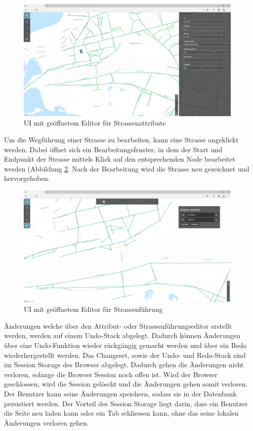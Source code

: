 \begin{figure}[H]
\centering
\includegraphics[height=6cm]{images/EditStreetattributes.PNG}
\caption{UI mit geöffnetem Editor für Strassenattribute}
\label{fig:editstreetattributes}
\end{figure}
\noindent
Um die Wegführung einer Strasse zu bearbeiten, kann eine Strasse angeklickt werden. Dabei öffnet sich ein Bearbeitungsfenster, in dem der Start und Endpunkt der Strasse mittels Klick auf den entsprechenden Node bearbeitet werden (Abbildung \ref{fig:editstreetdirection}. Nach der Bearbeitung wird die Strasse neu gezeichnet und hervorgehoben.\\
\begin{figure}[H]
\centering
\includegraphics[height=6cm]{images/EditStreetdirection.PNG}
\caption{UI mit geöffnetem Editor für Strassenführung}
\label{fig:editstreetdirection}
\end{figure}
\noindent
Änderungen welche über den Attribut-  oder Strassenführungseditor erstellt werden, werden auf einem Undo-Stack abgelegt. Dadurch können Änderungen über eine Undo-Funktion wieder rückgängig gemacht werden und über ein Redo wiederhergestellt werden. Das Changeset, sowie der Undo- und Redo-Stack sind im Session Storage des Browser abgelegt. Dadurch gehen die Änderungen nicht verloren, solange die Browser Session noch offen ist. Wird der Browser geschlossen, wird die Session gelöscht und die Änderungen gehen somit verloren. Der Benutzer kann seine Änderungen speichern, sodass sie in der Datenbank persistiert werden. Der Vorteil des Session Storage liegt darin, dass ein Benutzer die Seite neu laden kann oder ein Tab schliessen kann, ohne das seine lokalen Änderungen verloren gehen.
